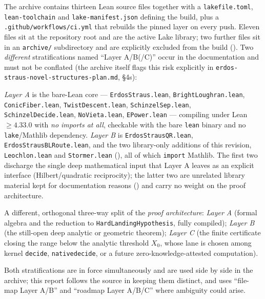 \documentclass[11pt]{article}
\theoremstyle{plain}
\theoremstyle{definition}
\theoremstyle{remark}
\newcommand{\file}[1]{\texttt{#1}}
\newcommand{\lean}[1]{\texttt{#1}}
\renewcommand{\_}{\textunderscore\allowbreak}
\begin{document}
The archive contains thirteen Lean source files together with a \file{lakefile.toml},
\file{lean-toolchain} and \file{lake-manifest.json} defining the build, plus a
\file{.github/workflows/ci.yml} that rebuilds the pinned layer on every push. Eleven files sit
at the repository root and are the active Lake library; two further files sit in an
\file{archive/} subdirectory and are explicitly excluded from the build
(). Two \emph{different} stratifications named ``Layer A/B(/C)'' occur in
the documentation and must not be conflated (the archive itself flags this risk explicitly in
\texttt{erdos-\allowbreak straus-\allowbreak novel-\allowbreak structures-\allowbreak plan.md},
\S4s):

\begin{description}[leftmargin=1.4em]
  \item[File-map layers (\file{README.md}).] \emph{Layer A} is the bare-Lean core —
        \file{ErdosStraus.lean}, \file{BrightLoughran.lean}, \file{ConicFiber.lean},
        \file{TwistDescent.lean}, \file{SchinzelSep.lean}, \file{SchinzelDecide.lean},
        \file{NoVieta.lean}, \file{EPower.lean} — compiling under Lean~$\ge 4.33.0$ with \emph{no imports at all},
        checkable with the bare \texttt{lean} binary and no \texttt{lake}/Mathlib dependency.
        \emph{Layer B} is \file{ErdosStrausQR.lean}, \file{ErdosStrausBLRoute.lean}, and the two
        library-only additions of this revision, \lean{Leochlon.lean} and \lean{Stormer.lean}
        (), all of which \texttt{import} Mathlib. The first
        two discharge the single deep mathematical input that Layer A leaves as an explicit
        interface (Hilbert/quadratic reciprocity); the latter two are unrelated library material
        kept for documentation reasons () and carry no weight on the proof
        architecture.
  \item[Roadmap layers (\texttt{erdos-\allowbreak straus-\allowbreak road-\allowbreak to-\allowbreak lean-\allowbreak qed.md}, \S14).] A different,
        orthogonal three-way split of the \emph{proof architecture}: \emph{Layer A} (formal
        algebra and the reduction to \lean{HardLandingHypothesis}, fully compiled); \emph{Layer
        B} (the still-open deep analytic or geometric theorem); \emph{Layer C} (the finite
        certificate closing the range below the analytic threshold $X_0$, whose lane is chosen
        among kernel \texttt{decide}, \texttt{native\_decide}, or a future zero-knowledge-attested
        computation).
\end{description}
Both stratifications are in force simultaneously and are used side by side in the archive; this
report follows the source in keeping them distinct, and uses ``file-map Layer A/B'' and
``roadmap Layer A/B/C'' where ambiguity could arise.
\end{document}
